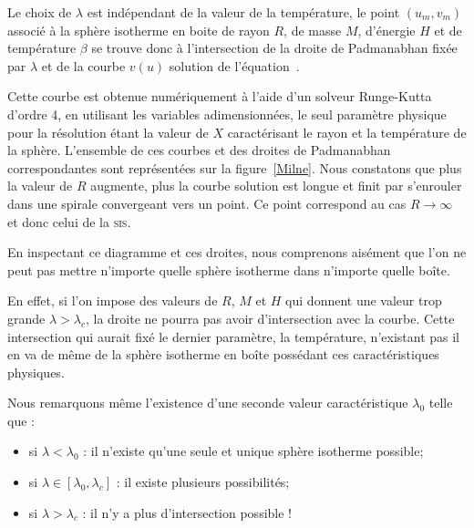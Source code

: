 	Le choix de $\lambda$ est indépendant de la valeur de la température, le point $(u_m,v_m)$ associé à la sphère
	isotherme en boite de rayon $R$, de masse $M$, d'énergie $H$ et de température $\beta$ se trouve donc à
	l'intersection de la droite de Padmanabhan fixée par $\lambda$ et de la courbe $v(u)$ solution de
	l'équation~. 
	
	
	Cette courbe est obtenue numériquement à l'aide d'un solveur Runge-Kutta d'ordre 4, en utilisant les variables adimensionnées, le
	seul paramètre physique pour la résolution étant la valeur de $X$ caractérisant le rayon et la température de la
	sphère.  L'ensemble de ces courbes et des droites de Padmanabhan correspondantes sont représentées sur la figure~\ref{Milne}.
	Nous constatons que plus la valeur de $R$ augmente, plus la courbe
	solution est longue et finit par s'enrouler dans une spirale convergeant vers un point. Ce point correspond au
	cas $R\to\infty$ et donc celui de la \textsc{sis}.
	
	En inspectant ce diagramme et ces droites,
	nous comprenons aisément que l'on ne peut pas mettre
	n'importe quelle sphère isotherme dans n'importe quelle boîte. %

	En effet, si l'on impose des valeurs de $R$,
	$M$ et $H$ qui donnent une valeur trop grande $\lambda>\lambda_c$, la droite ne pourra pas avoir d'intersection
	avec la courbe. Cette intersection qui aurait fixé le dernier paramètre, la température, n'existant pas il en va
	de même de la sphère isotherme en boîte possédant ces caractéristiques physiques.
	
	Nous remarquons même l'existence d'une seconde valeur caractéristique $\lambda_0$ telle que :
	\begin{itemize}
		\item si $\lambda < \lambda_0$ : il n'existe qu'une seule et unique sphère isotherme possible;
		\item si $\lambda \in \left[\lambda_0,\lambda_c\right]$ : il existe plusieurs possibilités;
		\item si $\lambda > \lambda_c$ : il n'y a plus d'intersection possible !
	\end{itemize}

